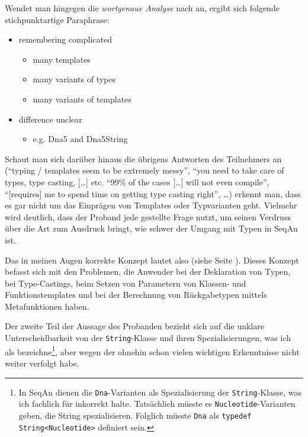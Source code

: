 \begin{description}
\begin{description}
    Wendet man hingegen die \textit{wortgenaue Analyse} nach \cite{charmaz2006constructing} an, ergibt sich folgende stichpunktartige Paraphrase:
    \begin{itemize}
    \itemsep1pt\parskip0pt
    \item remembering complicated
      \begin{itemize}
        \item many templates
        \item many variants of types
        \item many variants of templates
      \end{itemize}
      \item difference unclear
      \begin{itemize}
        \item e.g. Dna5 and Dna5String
      \end{itemize}
    \end{itemize}
    
    Schaut man sich darüber hinaus die übrigens Antworten des Teilnehmers an (``typing / templates seem to be extremely messy'', ``you need to take care of types, type casting, [\ldots] etc. ``99\% of the cases [\ldots] will not even compile'', ``[requires] me to spend time on getting type casting right'', \ldots) erkennt man, dass es gar nicht um das Einprägen von Templates oder Typvarianten geht. Vielmehr wird deutlich, dass der Proband jede gestellte Frage nutzt, um seinen Verdruss über die Art zum Ausdruck bringt, wie schwer der Umgang mit Typen in SeqAn ist.
    
    Das in meinen Augen korrekte Konzept lautet also  (siehe Seite \pageref{sec:typing}). Dieses Konzept befasst sich mit den Problemen, die Anwender bei der Deklaration von Typen, bei Type-Castings, beim Setzen von Parametern von Klassen- und Funktionstemplates und bei der Berechnung von Rückgabetypen mittels Metafunktionen haben.
    
    Der zweite Teil der Aussage des Probanden bezieht sich auf die unklare Unterscheidbarkeit von der \texttt{String}-Klasse und ihren Spezialisierungen, was ich als  bezeichne\footnote{In SeqAn dienen die \texttt{Dna}-Varianten als Spezialisierung der \texttt{String}-Klasse, was ich fachlich für inkorrekt halte. Tatsächlich müsste es \texttt{Nucleotide}-Varianten geben, die String spezialisieren. Folglich müsste \texttt{Dna} als \texttt{typedef String<Nucleotide>} definiert sein.}, aber wegen der ohnehin schon vielen wichtigen Erkenntnisse nicht weiter verfolgt habe.
    

\end{description}
\end{description}
